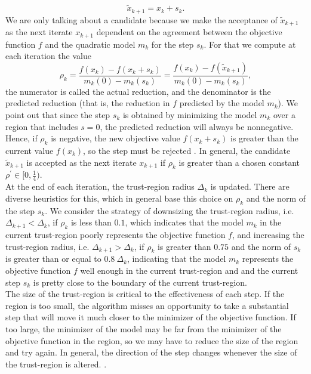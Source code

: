 \begin{equation}\label{candidate}
    \widetilde{x}_{k+1} = x_k + s_k.
\end{equation}
We are only talking about a candidate because we make the acceptance of $\widetilde{x}_{k+1}$ as the next iterate $x_{k+1}$ dependent on the agreement between the objective function $f$ and the quadratic model $m_k$ for the step $s_k$. For that we compute at each iteration the value
\begin{equation}\label{agreement}
    \rho_k = \frac{f(x_k) - f(x_k + s_k)}{m_k(0) - m_k(s_k)} = \frac{f(x_k) - f(\widetilde{x}_{k+1})}{m_k(0) - m_k(s_k)},
\end{equation}
the numerator is called the actual reduction, and the denominator is the predicted reduction (that is, the reduction in $f$ predicted by the model $m_k$). We point out that since the step $s_k$ is obtained by minimizing the model $m_k$ over a region that includes $s = 0$, the predicted reduction will always be nonnegative. Hence, if $\rho_k$ is negative, the new objective value $f(x_k + s_k)$ is greater than the current value $f(x_k)$, so the step must be rejected \cite[p.~68-69]{NocedalWright:2006}. In general, the candidate $\widetilde{x}_{k+1}$ is accepted as the next iterate $x_{k+1}$ if $\rho_k$ is greater than a chosen constant $\rho^{\prime} \in [0 , \frac{1}{4})$. \\
At the end of each iteration, the trust-region radius $\Delta_k$ is updated. There are diverse heuristics for this, which in general base this choice on $\rho_k$ and the norm of the step $s_k$. We consider the strategy of downsizing the trust-region radius, i.e. $\Delta_{k+1} < \Delta_k$, if $\rho_k$ is less than $0.1$, which indicates that the model $m_k$ in the current trust-region poorly represents the objective function $f$, and increasing the trust-region radius, i.e. $\Delta_{k+1} > \Delta_k$, if $\rho_k$ is greater than $0.75$ and the norm of $s_k$ is greater than or equal to $0.8 \ \Delta_k$, indicating that the model $m_k$ represents the objective function $f$ well enough in the current trust-region and and the current step $s_k$ is pretty close to the boundary of the current trust-region. \\
The size of the trust-region is critical to the effectiveness of each step. If the region is too small, the algorithm misses an opportunity to take a substantial step that will move it much closer to the minimizer of the objective function. If too large, the minimizer of the model may be far from the minimizer of the objective function in the region, so we may have to reduce the size of the region and try again. In general, the direction of the step changes whenever the size of the trust-region is altered. \cite[p.~67]{NocedalWright:2006}. \\


